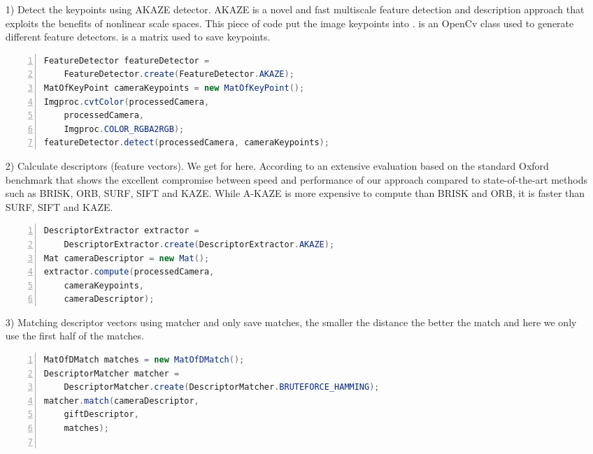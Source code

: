 \begin{enumerate}
\item[1)] Detect the keypoints using {\ttfamily AKAZE} detector. {\ttfamily AKAZE} is a novel and fast multiscale feature detection and description approach that exploits the benefits of nonlinear scale spaces.\cite{alcantarilla2011fast} This piece of code put the  image keypoints into .  is an OpenCv class used to generate different feature detectors.  is a matrix used to save keypoints.

\begin{lstlisting}[caption={Detect the Keypoints},language={java},
        numbers=left,basicstyle=\footnotesize\ttfamily,breaklines=true,xleftmargin=.05\textwidth, xrightmargin=.05\textwidth]
FeatureDetector featureDetector =
    FeatureDetector.create(FeatureDetector.AKAZE);
MatOfKeyPoint cameraKeypoints = new MatOfKeyPoint();
Imgproc.cvtColor(processedCamera, 
    processedCamera,
    Imgproc.COLOR_RGBA2RGB);
featureDetector.detect(processedCamera, cameraKeypoints);
\end{lstlisting} 

\item[2)] Calculate descriptors (feature vectors). We get  for  here. According to an extensive evaluation based on the standard Oxford benchmark \cite{mikolajczyk2005} that shows the excellent compromise between speed and performance of our approach compared to state-of-the-art methods such as BRISK, ORB, SURF, SIFT and KAZE. While A-KAZE is more expensive to compute than BRISK and ORB, it is faster than SURF, SIFT and KAZE.\cite{alcantarilla2011fast}
\begin{lstlisting}[caption={Calculate Descriptors},language={java},
        numbers=left,basicstyle=\footnotesize\ttfamily,breaklines=true,xleftmargin=.05\textwidth, xrightmargin=.05\textwidth]
DescriptorExtractor extractor =
    DescriptorExtractor.create(DescriptorExtractor.AKAZE);
Mat cameraDescriptor = new Mat();
extractor.compute(processedCamera, 
    cameraKeypoints, 
    cameraDescriptor);
\end{lstlisting} 
\item[3)] Matching descriptor vectors using  matcher and only save  matches, the smaller the distance the better the match and here we only use the first half of the matches. 
\begin{lstlisting}[caption={Matching Descriptor Vectors},language={java},
        numbers=left,basicstyle=\footnotesize\ttfamily,breaklines=true,xleftmargin=.05\textwidth, xrightmargin=.05\textwidth]
MatOfDMatch matches = new MatOfDMatch();
DescriptorMatcher matcher =
    DescriptorMatcher.create(DescriptorMatcher.BRUTEFORCE_HAMMING);
matcher.match(cameraDescriptor, 
    giftDescriptor, 
    matches);
            

\end{lstlisting}
\end{enumerate}
